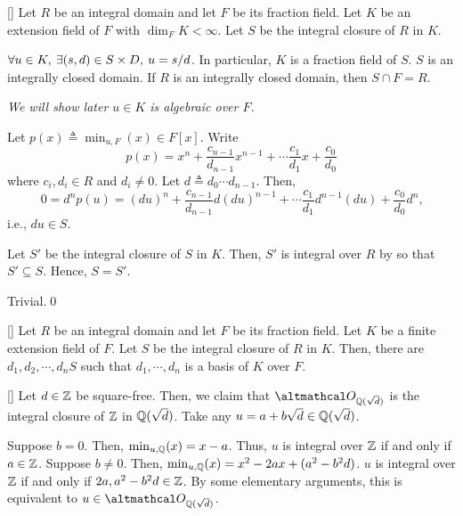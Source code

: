 \documentclass[../modern_algebra_2.tex]{subfiles}
\begin{document}
\begin{Theorem}{}[]
    Let \(R\) be an integral domain and let \(F\) be its fraction field.
    Let \(K\) be an extension field of \(F\) with \(\dim_F K < \infty\).
    Let \(S\) be the integral closure of \(R\) in \(K\).
    \begin{enumerate}[label=(\arabic*)]
        \ii \(\forall u \in K,\: \exists (s, d) \in S \times D,\: u = s/d\).
        In particular, \(K\) is a fraction field of \(S\).
        \ii \(S\) is an integrally closed domain.
        \ii If \(R\) is an integrally closed domain, then \(S \cap F = R\).
    \end{enumerate}
    \emph{We will show later \(u \in K\) is algebraic over \(F\).}
\end{Theorem}
\begin{myproof}[Proof]\hfill
\begin{enumerate}[label=(\arabic*)]
    \ii
    Let \(p(x) \triangleq \min_{u,F}(x) \in F[x]\).
    Write
    \[
        p(x) = x^{n} + \frac{c_{n-1}}{d_{n-1}}x^{n-1} + \cdots \frac{c_1}{d_1}x + \frac{c_0}{d_0}
    \]
    where \(c_i, d_i \in R\) and \(d_i \neq 0\).
    Let \(d \triangleq d_0 \cdots d_{n-1}\). Then,
    \[
        0 = d^np(u) = (du)^n + \frac{c_{n-1}}{d_{n-1}} d(du)^{n-1} + \cdots
        \frac{c_1}{d_1}d^{n-1}(du) + \frac{c_0}{d_0}d^n\text{,}
    \]
    i.e., \(du \in S\).

    \ii
    Let \(S'\) be the integral closure of \(S\) in \(K\).
    Then, \(S'\) is integral over \(R\) by  so that \(S' \subseteq S\).
    Hence, \(S = S'\).

    \ii
    Trivial.\qed
\end{enumerate}

\begin{Corollary}{}[]
    Let \(R\) be an integral domain and let \(F\) be its fraction field.
    Let \(K\) be a finite extension field of \(F\).
    Let \(S\) be the integral closure of \(R\) in \(K\).
    Then, there are \(d_1, d_2, \cdots, d_n S\) such that \(d_1, \cdots, d_n\) is a basis of \(K\)
    over \(F\).
\end{Corollary}

\begin{Example}{}[]
    Let \(d \in \ZZ\) be square-free.
    Then, we claim that \(\rqi{\sqrt{d}}\) is the integral closure of \(\ZZ\) in \(\QQ(\sqrt{d})\).
    Take any \(u = a + b\sqrt{d} \in \QQ(\sqrt{d})\).
    \begin{itemize}
        \ii
        Suppose \(b = 0\).
        Then, \(\min_{u,\QQ}(x) = x - a\). Thus, \(u\) is integral over \(\ZZ\) if and
        only if \(a \in \ZZ\).
        \ii
        Suppose \(b \neq 0\).
        Then, \(\min_{u,\QQ}(x) = x^2 - 2ax + (a^2-b^2d)\).
        \(u\) is integral over \(\ZZ\) if and only if \(2a, a^2-b^2d \in \ZZ\).
        By some elementary arguments, this is equivalent to \(u \in \rqi{\sqrt{d}}\).
    \end{itemize}
\end{Example}

\end{myproof}
\end{document}
